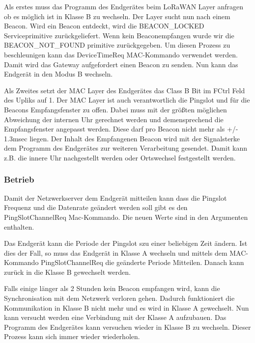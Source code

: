 \documentclass[a4paper,12pt]{article}
\begin{document}
                Als erstes muss das Programm des Endgerätes beim LoRaWAN Layer anfragen ob es möglich ist in Klasse B 
                zu wechseln. Der Layer sucht nun nach einem Beacon. Wird ein Beacon entdeckt, wird die BEACON\_LOCKED 
                Serviceprimitive 
                zurückgeliefert. Wenn kein Beaconempfangen wurde wir die 
                BEACON\_NOT\_FOUND primitive zurückgegeben. Um diesen Prozess zu beschleunigen kann das DeviceTimeReq 
                MAC-Kommando verwendet werden. Damit wird das Gateway aufgefordert einen Beacon zu senden. Nun kann 
                das Endgerät in den Modus B wechseln.

                Als Zweites setzt der MAC Layer des Endgerätes das Class B Bit im FCtrl Feld des Upliks auf 1. Der MAC 
                Layer ist auch verantwortlich die Pingslot und für die Beacons Empfangsfenster zu offen. Dabei muss mit 
                der größten möglichen Abweichung der internen Uhr gerechnet werden und demensprechend die 
                Empfangsfenster angepasst werden. Diese darf pro Beacon nicht mehr als +/- 1.3msec liegen. 
                \cite[S.73]{LoRaSpec}Der Inhalt des Empfangenen Beacon wird mit der Signalsterke dem Programm des 
                Endgerätes zur weiteren Verarbeitung gesendet. Damit kann z.B. die innere Uhr nachgestellt werden 
                oder Ortswechsel festgestellt werden.
            \subsubsection{Betrieb}
                Damit der Netzwerkserver dem Endgerät mitteilen kann dass die Pingslot Frequenz und die Datenrate 
                geändert werden soll gibt es den PingSlotChannelReq Mac-Kommando. Die neuen Werte sind in den 
                Argumenten enthalten.
                        
                Das Endgerät kann die Periode der Pingslot szu einer beliebigen Zeit ändern. Ist dies der Fall, so 
                muss das Endgerät in Klasse A wechseln und mittels dem MAC-Kommando PingSlotChannelReq die geänderte 
                Periode Mitteilen. Danach kann zurück in die Klasse B gewechselt werden.

                Falls einige länger als 2 Stunden kein Beacon empfangen wird, kann die Synchronisation mit dem Netzwerk 
                verloren gehen. Dadurch funktioniert die Kommunikation in Klasse B nicht mehr und es wird in Klasse A 
                gewechselt. Nun kann versucht werden eine Verbindung mit der Klasse A aufzubauen. Das Programm des 
                Endgerätes kann versuchen wieder in Klasse B zu wechseln. Dieser Prozess kann sich immer wieder 
                wiederholen.
\end{document}

